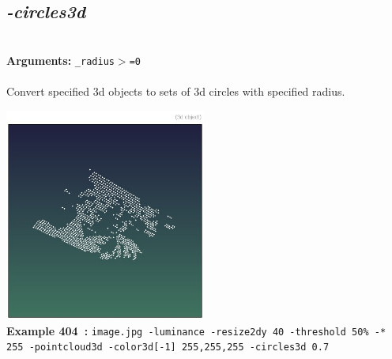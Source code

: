 \documentclass[a4paper,11pt,twoside]{book}
\begin{document}
\subsection{\emph{-circles3d} }\vspace*{-0.5em}
~\\\textbf{Arguments: } 
{\small \texttt{\_radius$>$=0}}\\~\\
Convert specified 3d objects to sets of 3d circles with specified radius.
\begin{center}\includegraphics[keepaspectratio=true,height=7cm,width=\textwidth]{img/gmic_def404.jpg}\\
{\footnotesize \textbf{Example 404~:} \texttt{image.jpg -luminance -resize2dy 40 -threshold 50\% -* 255 -pointcloud3d -color3d[-1] 255,255,255 -circles3d 0.7}}
\end{center}
\end{document}
